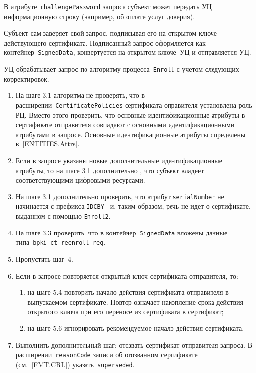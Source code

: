 В атрибуте~\texttt{challengePassword} запроса субъект может передать УЦ 
информационную строку (например, об оплате услуг доверия).

Субъект сам заверяет свой запрос, подписывая его на открытом ключе 
действующего сертификата. Подписанный запрос оформляется как 
контейнер~\texttt{SignedData}, конвертуется на открытом ключе~УЦ
и отправляется УЦ.

УЦ обрабатывает запрос по алгоритму процесса~\texttt{Enroll}
с учетом следующих корректировок.
\begin{enumerate}
\item
На шаге 3.1 алгоритма не проверять, что в
расширении~\texttt{CertificatePolicies} сертификата оправителя установлена
роль РЦ. Вместо этого проверить, что основные идентификационные атрибуты
в сертификате отправителя совпадают с основными идентификационными
атрибутами в запросе. Основные идентификационные атрибуты определены
в~\ref{ENTITIES.Attrs}.

\item
Если в запросе указаны новые дополнительные идентификационные атрибуты,
то на шаге 3.1 дополнительно , что субъект 
владеет соответствующими цифровыми ресурсами. 

\item
На шаге 3.1 дополнительно проверить, что атрибут \texttt{serialNumber}
не начинается с префикса \texttt{IDCBY-} и, таким образом,
речь не идет о сертификате, выданном с помощью \texttt{Enroll2}.
 
\item
На шаге 3.3 проверить, что в контейнер~\texttt{SignedData} вложены данные 
типа~\texttt{bpki-ct-reenroll-req}. 

\item
Пропустить шаг~4.

\item
Если в запросе повторяется открытый ключ сертификата отправителя, то:
\begin{enumerate}
\item
на шаге 5.4 повторить начало действия сертификата отправителя в выпускаемом 
сертификате. Повтор означает накопление срока действия открытого ключа 
при его переносе из сертификата в сертификат; 

%

\item
на шаге 5.6 игнорировать рекомендуемое начало действия сертификата.
\end{enumerate}

\item
Выполнить дополнительный шаг: отозвать сертификат отправителя запроса.
%
В расширении~\texttt{reasonCode} записи об отозванном сертификате 
(см.~\ref{FMT.CRL}) указать~\texttt{superseded}.
\end{enumerate}


